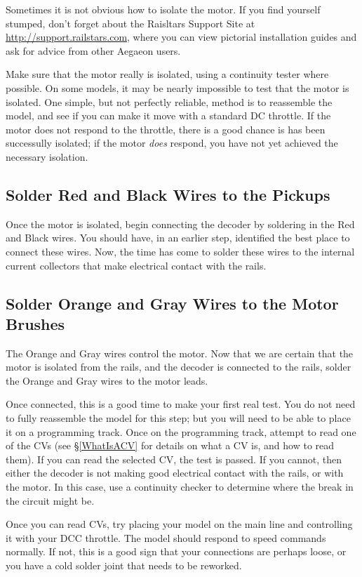 \documentclass[12pt,letterpaper,draft]{memoir} %
\begin{document}
Sometimes it is not obvious how to isolate the motor. If you find yourself stumped, don't forget about the Raisltars Support Site at \url{http://support.railstars.com}, where you can view pictorial installation guides and ask for advice from other Aegaeon users.

Make sure that the motor really is isolated, using a continuity tester where possible. On some models, it may be nearly impossible to test that the motor is isolated. One simple, but not perfectly reliable, method is to reassemble the model, and see if you can make it move with a standard DC throttle. If the motor does not respond to the throttle, there is a good chance is has been successully isolated; if the motor \textit{does} respond, you have not yet achieved the necessary isolation.

\subsection{Solder Red and Black Wires to the Pickups}
Once the motor is isolated, begin connecting the decoder by soldering in the Red and Black wires. You should have, in an earlier step, identified the best place to connect these wires. Now, the time has come to solder these wires to the internal current collectors that make electrical contact with the rails.

\subsection{Solder Orange and Gray Wires to the Motor Brushes}

The Orange and Gray wires control the motor. Now that we are certain that the motor is isolated from the rails, and the decoder is connected to the rails, solder the Orange and Gray wires to the motor leads.

Once connected, this is a good time to make your first real test. You do not need to fully reassemble the model for this step; but you will need to be able to place it on a programming track. Once on the programming track, attempt to read one of the CVs (see \S\ref{WhatIsACV} for details on what a CV is, and how to read them). If you can read the selected CV, the test is passed. If you cannot, then either the decoder is not making good electrical contact with the rails, or with the motor. In this case, use a continuity checker to determine where the break in the circuit might be.

Once you can read CVs, try placing your model on the main line and controlling it with your DCC throttle. The model should respond to speed commands normally. If not, this is a good sign that your connections are perhaps loose, or you have a cold solder joint that needs to be reworked.
\end{document}

